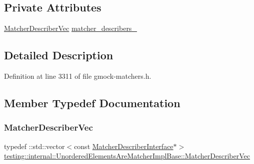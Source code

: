 \subsection*{Private Attributes}
\begin{DoxyCompactItemize}
\item 
\hyperlink{classtesting_1_1internal_1_1UnorderedElementsAreMatcherImplBase_a81ca7ce793d4b25ce2a7d3e28b48cd64}{Matcher\+Describer\+Vec} \hyperlink{classtesting_1_1internal_1_1UnorderedElementsAreMatcherImplBase_af416e45f53ebdfe4bccd710142db1600}{matcher\+\_\+describers\+\_\+}
\end{DoxyCompactItemize}


\subsection{Detailed Description}


Definition at line 3311 of file gmock-\/matchers.\+h.



\subsection{Member Typedef Documentation}
\mbox{\label{classtesting_1_1internal_1_1UnorderedElementsAreMatcherImplBase_a81ca7ce793d4b25ce2a7d3e28b48cd64}} 
\subsubsection{\texorpdfstring{Matcher\+Describer\+Vec}{MatcherDescriberVec}}
{\footnotesize\ttfamily typedef \+::std\+::vector$<$const \hyperlink{classtesting_1_1MatcherDescriberInterface}{Matcher\+Describer\+Interface}$\ast$$>$ \hyperlink{classtesting_1_1internal_1_1UnorderedElementsAreMatcherImplBase_a81ca7ce793d4b25ce2a7d3e28b48cd64}{testing\+::internal\+::\+Unordered\+Elements\+Are\+Matcher\+Impl\+Base\+::\+Matcher\+Describer\+Vec}\hspace{0.3cm}{\ttfamily [protected]}}



